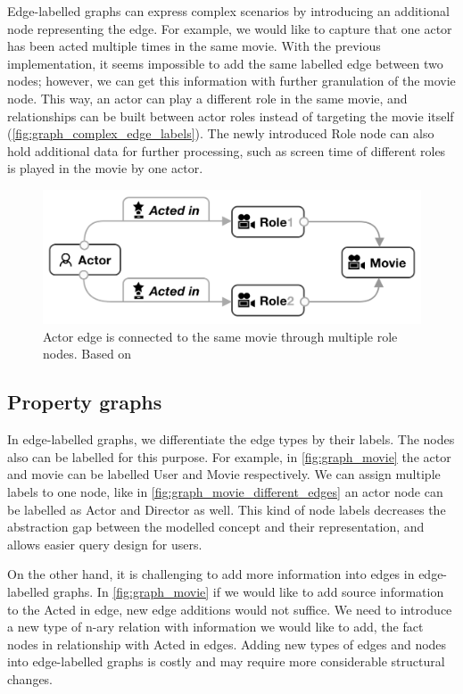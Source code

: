 Edge-labelled graphs can express complex scenarios by introducing an additional node representing the edge.
For example, we would like to capture that one actor has been acted multiple times in the same movie.
With the previous implementation, it seems impossible to add the same labelled edge between two nodes; however, we can get this information with further granulation of the movie node.
This way, an actor can play a different role in the same movie, and relationships can be built between actor roles instead of targeting the movie itself (\autoref{fig:graph_complex_edge_labels}).
The newly introduced \textsf{Role} node can also hold additional data for further processing, such as screen time of different roles is played in the movie by one actor.

\begin{figure}[!ht]
  \centering
  \includegraphics[scale=0.3]{figures/graph_complex_edge_labels.png}
  \caption{Actor edge is connected to the same movie through multiple role nodes. Based on~\cite{DBLP:journals/csur/AnglesABHRV17}} 
  \label{fig:graph_complex_edge_labels}
\end{figure}

\subsection{Property graphs}

In edge-labelled graphs, we differentiate the edge types by their labels.
The nodes also can be labelled for this purpose.
For example, in \autoref{fig:graph_movie} the actor and movie can be labelled \textsf{User} and \textsf{Movie} respectively.
We can assign multiple labels to one node, like in \autoref{fig:graph_movie_different_edges} an actor node can be labelled as \textsf{Actor} and \textsf{Director} as well.
This kind of node labels decreases the abstraction gap between the modelled concept and their representation, and allows easier query design for users.

On the other hand, it is challenging to add more information into edges in edge-labelled graphs.
In \autoref{fig:graph_movie} if we would like to add source information to the \textsf{Acted in} edge, new edge additions would not suffice.
We need to introduce a new type of n-ary relation with information we would like to add, the fact nodes in relationship with \textsf{Acted in} edges.
Adding new types of edges and nodes into edge-labelled graphs is costly and may require more considerable structural changes.

